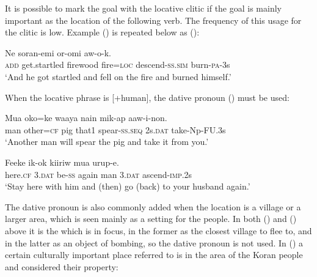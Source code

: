 It is possible to mark the goal with the locative clitic if the goal is mainly important as the location of the following verb. The frequency of this usage for the clitic is low. Example () is repeated below as (): 

\ea%
\label{ex:x1884}
\gll Ne  soran-emi    or-omi  aw-o-k.
 \\
    \textsc{add}  get.startled  firewood  fire=\textsc{loc} descend-\textsc{ss}.\textsc{sim}  burn-\textsc{pa}-3s \\
\glt `And he got startled and fell on the fire and burned himself.'
\z




 

When the locative phrase is [+human], the dative pronoun () must be used:

\ea%
\label{ex:x1061}
\gll Mua  oko=ke  waaya  nain  mik-ap   aaw-i-non. \\
     man  other=\textsc{cf}  pig  that1  spear-\textsc{ss}.\textsc{seq}  2s.\textsc{dat}  take-Np-FU.3s \\
\glt`Another man will spear the pig and take it from you.'
\z





\ea%
\label{ex:x1939}
\gll Feeke    ik-ok  kiiriw  mua    urup-e. \\
    here.\textsc{cf}  3.\textsc{dat}  be-\textsc{ss}  again  man  3.\textsc{dat}  ascend-\textsc{imp}.2s  \\
\glt`Stay here with him and (then) go (back) to your husband again.'
\z





The dative pronoun is also commonly added when the location is a village or a larger area, which is seen mainly as a setting for the people. In both () and () above it is the  which is in focus, in the former as the closest village to flee to, and in the latter as an object of bombing, so the dative pronoun is not used. In () a certain culturally important place referred to is in the area of the Koran people and considered their property:

